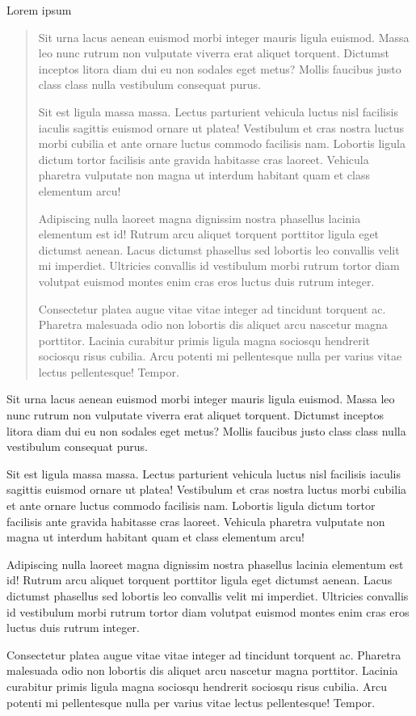 \documentclass[grad,numbers]{coppe}
\begin{document}
  Lorem ipsum
  \begin{abstract}
Sit urna lacus aenean euismod morbi integer mauris ligula euismod. Massa leo nunc rutrum non vulputate viverra erat aliquet torquent. Dictumst inceptos litora diam dui eu non sodales eget metus? Mollis faucibus justo class class nulla vestibulum consequat purus.

Sit est ligula massa massa. Lectus parturient vehicula luctus nisl facilisis iaculis sagittis euismod ornare ut platea! Vestibulum et cras nostra luctus morbi cubilia et ante ornare luctus commodo facilisis nam. Lobortis ligula dictum tortor facilisis ante gravida habitasse cras laoreet. Vehicula pharetra vulputate non magna ut interdum habitant quam et class elementum arcu!

Adipiscing nulla laoreet magna dignissim nostra phasellus lacinia elementum est id! Rutrum arcu aliquet torquent porttitor ligula eget dictumst aenean. Lacus dictumst phasellus sed lobortis leo convallis velit mi imperdiet. Ultricies convallis id vestibulum morbi rutrum tortor diam volutpat euismod montes enim cras eros luctus duis rutrum integer.

Consectetur platea augue vitae vitae integer ad tincidunt torquent ac. Pharetra malesuada odio non lobortis dis aliquet arcu nascetur magna porttitor. Lacinia curabitur primis ligula magna sociosqu hendrerit sociosqu risus cubilia. Arcu potenti mi pellentesque nulla per varius vitae lectus pellentesque! Tempor.
  \end{abstract}
  \begin{foreignabstract}
Sit urna lacus aenean euismod morbi integer mauris ligula euismod. Massa leo nunc rutrum non vulputate viverra erat aliquet torquent. Dictumst inceptos litora diam dui eu non sodales eget metus? Mollis faucibus justo class class nulla vestibulum consequat purus.

Sit est ligula massa massa. Lectus parturient vehicula luctus nisl facilisis iaculis sagittis euismod ornare ut platea! Vestibulum et cras nostra luctus morbi cubilia et ante ornare luctus commodo facilisis nam. Lobortis ligula dictum tortor facilisis ante gravida habitasse cras laoreet. Vehicula pharetra vulputate non magna ut interdum habitant quam et class elementum arcu!

Adipiscing nulla laoreet magna dignissim nostra phasellus lacinia elementum est id! Rutrum arcu aliquet torquent porttitor ligula eget dictumst aenean. Lacus dictumst phasellus sed lobortis leo convallis velit mi imperdiet. Ultricies convallis id vestibulum morbi rutrum tortor diam volutpat euismod montes enim cras eros luctus duis rutrum integer.

Consectetur platea augue vitae vitae integer ad tincidunt torquent ac. Pharetra malesuada odio non lobortis dis aliquet arcu nascetur magna porttitor. Lacinia curabitur primis ligula magna sociosqu hendrerit sociosqu risus cubilia. Arcu potenti mi pellentesque nulla per varius vitae lectus pellentesque! Tempor.
  \end{foreignabstract}
  \tableofcontents
\end{document}

